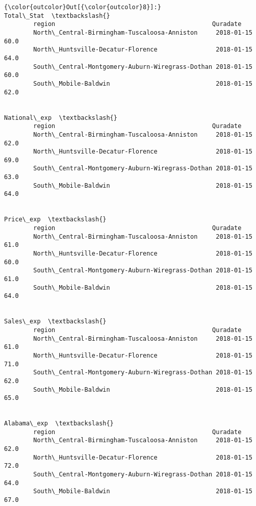 \documentclass[11pt]{article}
\begin{document}
\begin{Verbatim}[commandchars=\\\{\}]
{\color{outcolor}Out[{\color{outcolor}8}]:}                                                              Total\_Stat  \textbackslash{}
        region                                           Quradate                 
        North\_Central-Birmingham-Tuscaloosa-Anniston     2018-01-15        60.0   
        North\_Huntsville-Decatur-Florence                2018-01-15        64.0   
        South\_Central-Montgomery-Auburn-Wiregrass-Dothan 2018-01-15        60.0   
        South\_Mobile-Baldwin                             2018-01-15        62.0   
        
                                                                     National\_exp  \textbackslash{}
        region                                           Quradate                   
        North\_Central-Birmingham-Tuscaloosa-Anniston     2018-01-15          62.0   
        North\_Huntsville-Decatur-Florence                2018-01-15          69.0   
        South\_Central-Montgomery-Auburn-Wiregrass-Dothan 2018-01-15          63.0   
        South\_Mobile-Baldwin                             2018-01-15          64.0   
        
                                                                     Price\_exp  \textbackslash{}
        region                                           Quradate                
        North\_Central-Birmingham-Tuscaloosa-Anniston     2018-01-15       61.0   
        North\_Huntsville-Decatur-Florence                2018-01-15       60.0   
        South\_Central-Montgomery-Auburn-Wiregrass-Dothan 2018-01-15       61.0   
        South\_Mobile-Baldwin                             2018-01-15       64.0   
        
                                                                     Sales\_exp  \textbackslash{}
        region                                           Quradate                
        North\_Central-Birmingham-Tuscaloosa-Anniston     2018-01-15       61.0   
        North\_Huntsville-Decatur-Florence                2018-01-15       71.0   
        South\_Central-Montgomery-Auburn-Wiregrass-Dothan 2018-01-15       62.0   
        South\_Mobile-Baldwin                             2018-01-15       65.0   
        
                                                                     Alabama\_exp  \textbackslash{}
        region                                           Quradate                  
        North\_Central-Birmingham-Tuscaloosa-Anniston     2018-01-15         62.0   
        North\_Huntsville-Decatur-Florence                2018-01-15         72.0   
        South\_Central-Montgomery-Auburn-Wiregrass-Dothan 2018-01-15         64.0   
        South\_Mobile-Baldwin                             2018-01-15         67.0   
        

\end{Verbatim}
\end{document}

